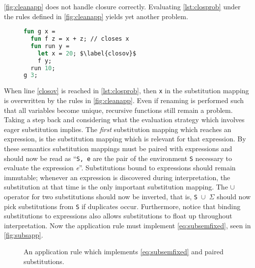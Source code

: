 \documentclass[11pt,oneside,a4paper]{report}
\begin{document}
\autoref{fig:cleanapp} does not handle closure correctly.
Evaluating \autoref{lst:closprob} under the rules defined in \autoref{fig:cleanapp} yields yet another problem.
\begin{figure}[ht]
\begin{lstlisting}[language=ML,caption={Program with closure},label={lst:closprob},mathescape=true]
fun g x =
  fun f z = x + z; // closes x
  fun run y =
    let x = 20; $\label{closov}$
    f y;
  run 10;
g 3;
\end{lstlisting}
\end{figure}
When line \autoref{closov} is reached in \autoref{lst:closprob}, then \texttt{x} in the substitution mapping is overwritten by the rules in \autoref{fig:cleanapp}.
Even if renaming is performed such that all variables become unique, recursive functions still remain a problem.
Taking a step back and considering what the evaluation strategy which involves eager substitution implies.
The \textit{first} substitution mapping which reaches an expression, is the substitution mapping which is relevant for that expression.
By these semantics substitution mappings must be paired with expressions and should now be read as ``\texttt{S, e} are the pair of the environment \texttt{S} necessary to evaluate the expression \textit{e}''.
Substitutions bound to expressions should remain immutable; whenever an expression is discovered during interpretation, the substitution at that time is the only important substitution mapping.
The $\cup$ operator for two substitutions should now be inverted, that is, \texttt{S $\cup$ $\Sigma$} should now pick substitutions from \texttt{S} if duplicates occur.
Furthermore, notice that binding substitutions to expressions also allows substitutions to float up throughout interpretation.
Now the application rule must implement \autoref{eq:subsemfixed}, seen in \autoref{fig:subsapp}.
\begin{figure}[ht]
    \begin{mdframed}[style=bigbox]
        \vspace*{0.4cm}
          \begin{prooftree}
          \end{prooftree}   
    \end{mdframed}
    \caption{An application rule which implements \autoref{eq:subsemfixed} and paired substitutions.
    }
    \label{fig:subsapp}
\end{figure}
\end{document}

